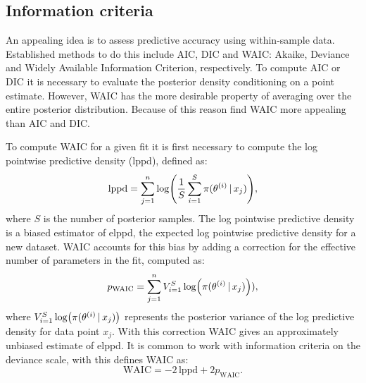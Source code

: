 \subsection{Information criteria}

An appealing idea is to assess predictive accuracy using within-sample data. Established
methods to do this include AIC, DIC and WAIC: Akaike, Deviance and Widely Available
Information Criterion, respectively. To compute AIC or DIC it is necessary to evaluate the
posterior density conditioning on a point estimate. However, WAIC has the more desirable
property of averaging over the entire posterior distribution. Because of this reason
\textcite{gelman13} find WAIC more appealing than AIC and DIC.

To compute WAIC for a given fit it is first necessary to compute the log pointwise
predictive density (lppd), defined as:
\begin{equation*}
  \text{lppd} = \sum_{j=1}^n \log(\frac{1}{S} \sum_{i=1}^S \pi(\theta^{(i)} \,|\, x_j)),
\end{equation*}
where $S$ is the number of posterior samples. The log pointwise predictive density is a
biased estimator of elppd, the expected log pointwise predictive density for a new
dataset.  WAIC accounts for this bias by adding a correction for the effective number of
parameters in the fit, computed as:
\begin{equation*}
    p_{\text{WAIC}} = \sum_{j=1}^n V_{i=1}^{S}\log(\pi(\theta^{(i)} \,|\, x_j))),
\end{equation*}
where $V_{i=1}^{S}\log(\pi(\theta^{(i)} \,|\, x_j))$ represents the posterior variance of
the log predictive density for data point $x_j$. With this correction WAIC gives an
approximately unbiased estimate of elppd. It is common to work with information criteria
on the deviance scale, with this \textcite{watanabe09} defines WAIC as:
\begin{equation*}
    \text{WAIC} = -2\,\text{lppd} +2p_{\text{WAIC}}.
\end{equation*}

